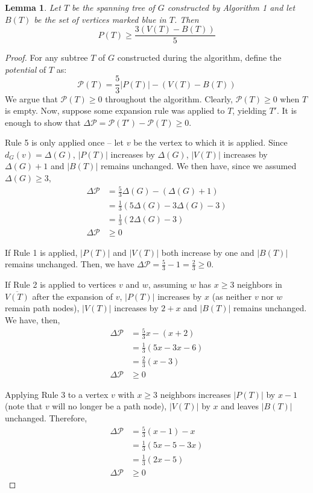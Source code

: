 \documentclass[12pt]{article}
\newtheorem{lemma}[theorem]{Lemma}
\begin{document}
\begin{lemma}
  Let $T$ be the spanning tree of $G$ constructed by Algorithm 1 and let $B(T)$ be the set of vertices marked blue in $T$.
  Then
  $$ P(T) \ge \frac{3(V(T) - B(T))}{5} $$
\end{lemma}
\begin{proof}
  For any subtree $T$ of $G$ constructed during the algorithm, define the \emph{potential} of $T$ as:
  $$ \mathcal{P}(T) = \frac{5}{3}|P(T)| - (V(T) - B(T)) $$
  We argue that $\mathcal{P}(T) \ge 0$ throughout the algorithm.
  Clearly, $\mathcal{P}(T) \ge 0$ when $T$ is empty.
  Now, suppose some expansion rule was applied to $T$, yielding $T'$.
  It is enough to show that $\Delta \mathcal{P} = \mathcal{P}(T') - \mathcal{P}(T) \ge 0$.

  Rule 5 is only applied once -- let $v$ be the vertex to which it is applied.
  Since $d_G(v) = \Delta(G)$, $|P(T)|$ increases by $\Delta(G)$, $|V(T)|$ increases by $\Delta(G) + 1$ and $|B(T)|$ remains unchanged.
  We then have, since we assumed $\Delta(G) \ge 3$,
  \begin{align*}
    \Delta \mathcal{P} &= \frac{5}{3}\Delta(G) - (\Delta(G) + 1) \\
                       &= \frac{1}{3}(5\Delta(G) - 3\Delta(G) - 3) \\
                       &= \frac{1}{3}(2\Delta(G) - 3) \\
    \Delta \mathcal{P} &\ge 0
  \end{align*}

  If Rule 1 is applied, $|P(T)|$ and $|V(T)|$ both increase by one and $|B(T)|$ remains unchanged.
  Then, we have $\Delta \mathcal{P} = \frac{5}{3} - 1 = \frac{2}{3} \ge 0$.

  If Rule 2 is applied to vertices $v$ and $w$, assuming $w$ has $x \ge 3$ neighbors in $\overline{V(T)}$ after the expansion of $v$, $|P(T)|$ increases by $x$ (as neither $v$ nor $w$ remain path nodes), $|V(T)|$ increases by $2 + x$ and $|B(T)|$ remains unchanged.
  We have, then,
  \begin{align*}
    \Delta \mathcal{P} &= \frac{5}{3}x - (x + 2) \\
                       &= \frac{1}{3}(5x - 3x - 6) \\
                       &= \frac{2}{3}(x - 3) \\
    \Delta \mathcal{P} &\ge 0
  \end{align*}

  Applying Rule 3 to a vertex $v$ with $x \ge 3$ neighbors increases $|P(T)|$ by $x - 1$ (note that $v$ will no longer be a path node), $|V(T)|$ by $x$ and leaves $|B(T)|$ unchanged.
  Therefore,
  \begin{align*}
    \Delta \mathcal{P} &= \frac{5}{3}(x - 1) - x \\
                       &= \frac{1}{3}(5x - 5 - 3x) \\
                       &= \frac{1}{3}(2x - 5) \\
    \Delta \mathcal{P} &\ge 0
  \end{align*}


\end{proof}
\end{document}
